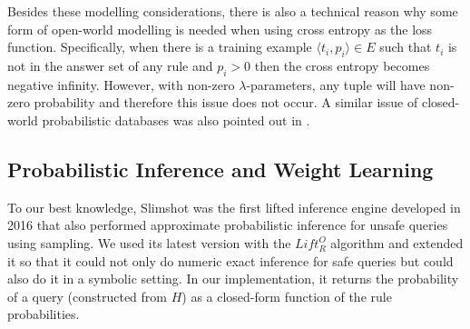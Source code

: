 \documentclass[akbc,twoside,11pt]{article}
\newcounter{example}
\newenvironment{example}[1][]{\refstepcounter{example}\par\medskip\noindent
   \textbf{Example~\theexample #1} \rmfamily}{\medskip}
\begin{document}
Besides these modelling considerations, there is also a technical reason why some form of open-world modelling is needed when using cross entropy as the loss function. Specifically, when there is a training example $\langle t_i, p_i \rangle \in E$ such that $t_i$ is not in the answer set of any rule and $p_i > 0$ then the cross entropy becomes negative infinity. However, with non-zero $\lambda$-parameters, any tuple will have non-zero probability and therefore this issue does not occur. A similar issue of closed-world probabilistic databases was also pointed out in \cite{DBLP:conf/kr/CeylanDB16}.  
\fi %


\subsection{Probabilistic Inference and Weight Learning} \label{sub:q} To our best knowledge, Slimshot \cite{DBLP:journals/pvldb/GribkoffS16} was the first lifted inference engine developed in 2016 that also performed approximate probabilistic inference for unsafe queries using sampling. We used its latest version \cite{SafeSample} with the $Lift^O_R$ algorithm and extended it so that it could not only do numeric exact inference for safe queries but could also do it in a symbolic setting. In our implementation, it returns the probability of a query (constructed from $H$) as a closed-form function of the rule probabilities.
\end{document}
